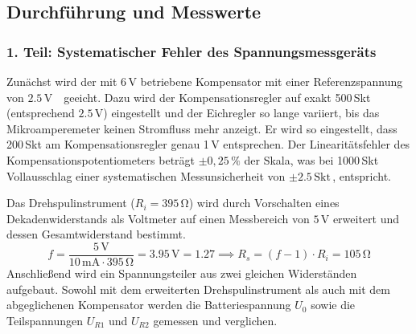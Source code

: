 \documentclass[12pt,a4paper,titlepage]{scrartcl}
\numberwithin{equation}{section}
\numberwithin{table}{section}
\numberwithin{figure}{section}
\begin{document}
\label{pdf}



\subsection{Durchführung und Messwerte}
\subsubsection{1. Teil: Systematischer Fehler des Spannungsmessgeräts}
Zunächst wird der mit 6\,V betriebene Kompensator mit einer Referenzspannung 
von $2.5\,\text{V}$~\footnotemark[1]\ geeicht. Dazu wird der Kompensationsregler auf
exakt 500\,Skt (entsprechend $2.5\,\text{V}$) eingestellt und der Eichregler
so lange variiert, bis das Mikroamperemeter keinen Stromfluss mehr anzeigt.
Er wird so eingestellt, dass 200\,Skt am Kompensationsregler genau 1\,V entsprechen.\label{Umrechnung Kompensator}
Der Linearitätsfehler des Kompensationspotentiometers beträgt $\pm 0,25\,\%$ der Skala,
was bei 1000\,Skt Vollausschlag einer systematischen Messunsicherheit von $\pm 2.5\,\text{Skt}$\,\footnotemark[2], entspricht.



\medskip
Das Drehspulinstrument ($R_i = 395\,\si{\ohm}$) wird durch Vorschalten eines Dekadenwiderstands als Voltmeter auf einen Messbereich von $5\,\text{V}$ erweitert
und dessen Gesamtwiderstand bestimmt. 
\begin{equation}
    f = \frac{5\,\text{V}}{10\,\text{mA} \cdot 395\,\si{\ohm}} = 3.95\,\si{\volt} = 1.27
    \implies R_s = (f-1) \cdot R_i = 105\,\si{\ohm}
\end{equation}
Anschließend wird ein Spannungsteiler aus zwei gleichen Widerständen aufgebaut. Sowohl mit dem erweiterten Drehspulinstrument als auch mit dem abgeglichenen Kompensator werden die Batteriespannung
$U_0$ sowie die Teilspannungen $U_{R1}$ und $U_{R2}$ gemessen und verglichen.
\end{document}

